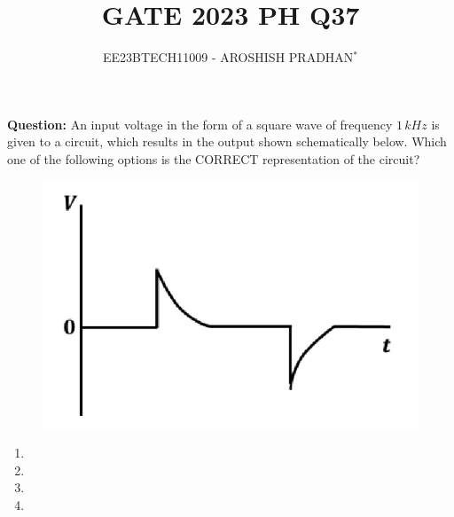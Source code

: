 \documentclass[journal,12pt,twocolumn]{IEEEtran}
\theoremstyle{remark}
\begin{document}

\vspace{3cm}

\title{GATE 2023 PH Q37}
\author{EE23BTECH11009 - AROSHISH PRADHAN$^{*}$%
}
\maketitle
\newpage
\bigskip
\textbf{Question:} An input voltage in the form of a square wave of frequency $1\, kHz$ is given to a circuit, which results in the output shown schematically below. Which one of the following options is the CORRECT representation of the circuit?

\begin{figure}[!h]
    \centering
    \includegraphics[width = \columnwidth]{figs/question.png}
    \caption{}
    \label{fig:ques_gate.ph.23.37}
\end{figure}

\begin{enumerate}[label = (\alph*)]
    \item
    \begin{minipage}[t]{\columnwidth}
        
    \end{minipage}
    \item
    \begin{minipage}[t]{\columnwidth}
        
    \end{minipage}
    \item
    \begin{minipage}[t]{\columnwidth}
        
    \end{minipage}
    \item
    \begin{minipage}[t]{\columnwidth}
        
    \end{minipage}
\end{enumerate}
\end{document}
